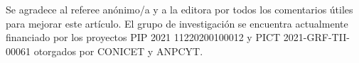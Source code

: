\documentclass[baaa]{baaa}
\begin{document}
\begin{acknowledgement}
Se agradece al referee anónimo/a y a la editora por todos los comentarios útiles para mejorar este artículo. El grupo de investigación se encuentra actualmente financiado por los proyectos PIP 2021 11220200100012 y PICT 2021-GRF-TII-00061 otorgados por CONICET y ANPCYT.
\end{acknowledgement}



\small

\end{document}
